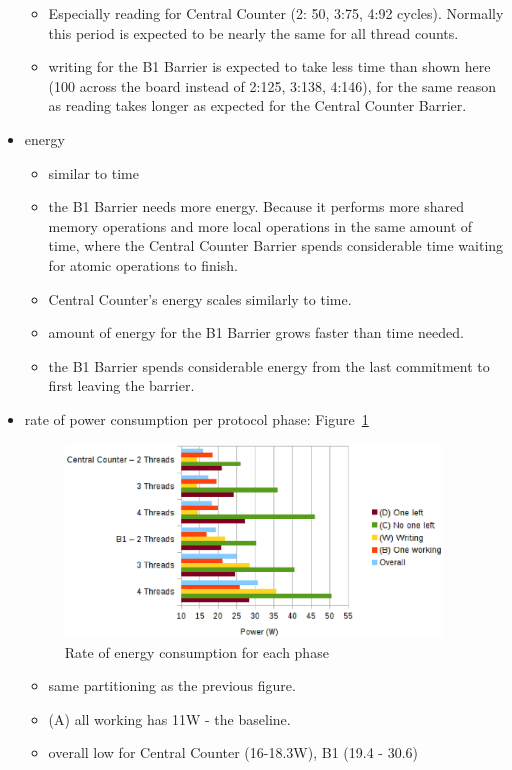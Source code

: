 \documentclass[a4paper, 10pt]{article}
\begin{document}
\begin{itemize}
\begin{itemize}
			\item Especially reading for Central Counter (2: 50, 3:75, 4:92 cycles). Normally this period is expected to be nearly the same for all thread counts.
			\item writing for the B1 Barrier is expected to take less time than shown here (100 across the board instead of 2:125, 3:138, 4:146), for the same reason as reading takes longer as expected for the Central Counter Barrier.
		\end{itemize}
	\item energy
		\begin{itemize}
			\item similar to time
			\item the B1 Barrier needs more energy. Because it performs more shared memory operations and more local operations in the same amount of time, where the Central Counter Barrier spends considerable time waiting for atomic operations to finish.
			\item Central Counter's energy scales similarly to time.
			\item amount of energy for the B1 Barrier grows faster than time needed.
			\item the B1 Barrier spends considerable energy from the last commitment to first leaving the barrier.
		\end{itemize}
	\item rate of power consumption per protocol phase: Figure~\ref{fig:c1-power-work-100}
		\begin{figure}[htbp]
			\centering
			\includegraphics[width=10cm]{charts/c1-power-work-100}
			\caption{Rate of energy consumption for each phase}
			\label{fig:c1-power-work-100}
		\end{figure}
		\begin{itemize}
			\item same partitioning as the previous figure.
			\item (A) all working has 11W - the baseline.
			\item overall low for Central Counter (16-18.3W), B1 (19.4 - 30.6)

\end{itemize}
\end{itemize}
\end{document}
